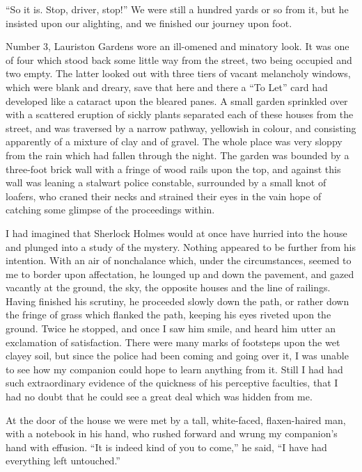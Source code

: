 \documentclass[12pt,english]{book}
\begin{document}
{}``So it is. Stop, driver, stop!'' We were still a hundred yards
or so from it, but he insisted upon our alighting, and we finished
our journey upon foot.

Number 3, Lauriston Gardens wore an ill-omened and minatory look.
It was one of four which stood back some little way from the street,
two being occupied and two empty. The latter looked out with three
tiers of vacant melancholy windows, which were blank and dreary, save
that here and there a {}``To Let'' card had developed like a cataract
upon the bleared panes. A small garden sprinkled over with a scattered
eruption of sickly plants separated each of these houses from the
street, and was traversed by a narrow pathway, yellowish in colour,
and consisting apparently of a mixture of clay and of gravel. The
whole place was very sloppy from the rain which had fallen through
the night. The garden was bounded by a three-foot brick wall with
a fringe of wood rails upon the top, and against this wall was leaning
a stalwart police constable, surrounded by a small knot of loafers,
who craned their necks and strained their eyes in the vain hope of
catching some glimpse of the proceedings within.

I had imagined that Sherlock Holmes would at once have hurried into
the house and plunged into a study of the mystery. Nothing appeared
to be further from his intention. With an air of nonchalance which,
under the circumstances, seemed to me to border upon affectation,
he lounged up and down the pavement, and gazed vacantly at the ground,
the sky, the opposite houses and the line of railings. Having finished
his scrutiny, he proceeded slowly down the path, or rather down the
fringe of grass which flanked the path, keeping his eyes riveted upon
the ground. Twice he stopped, and once I saw him smile, and heard
him utter an exclamation of satisfaction. There were many marks of
footsteps upon the wet clayey soil, but since the police had been
coming and going over it, I was unable to see how my companion could
hope to learn anything from it. Still I had had such extraordinary
evidence of the quickness of his perceptive faculties, that I had
no doubt that he could see a great deal which was hidden from me.

At the door of the house we were met by a tall, white-faced, flaxen-haired
man, with a notebook in his hand, who rushed forward and wrung my
companion's hand with effusion. {}``It is indeed kind of you to come,''
he said, {}``I have had everything left untouched.''
\end{document}
